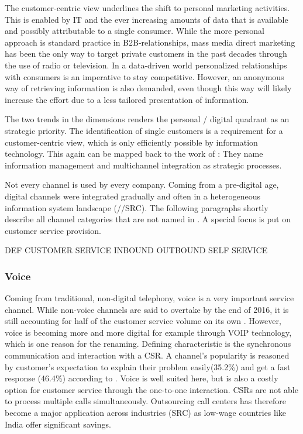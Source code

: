 		The customer-centric view underlines the shift to personal marketing activities. This is enabled by IT and the ever increasing amounts of data that is available and possibly attributable to a single consumer. While the more personal approach is standard practice in B2B-relationships, mass media direct marketing has been the only way to target private customers in the past decades through the use of radio or television. In a data-driven world personalized relationships with consumers is an imperative to stay competitive. However, an anonymous way of retrieving information is also demanded, even though this way will likely increase the effort due to a less tailored presentation of information. 
		
		The two trends in the dimensions renders the personal / digital quadrant as an strategic priority.
		The identification of single customers is a requirement for a customer-centric view, which is only efficiently possible by information technology.  
		This again can be mapped back to the work of \citeauthor{paynefrow2005}: They name information management and multichannel integration as strategic processes. 
		
		Not every channel is used by every company. Coming from a pre-digital age, digital channels were integrated gradually and often in a heterogeneous information system landscape (//SRC). The following paragraphs shortly describe all channel categories that are not named  in  \citeauthor{paynefrow2005}. A special focus is put on customer service provision. 
		
		DEF CUSTOMER SERVICE
		INBOUND
		OUTBOUND
		SELF SERVICE
		
		
		\subsubsection{Voice}
		
		Coming from traditional, non-digital telephony, voice is a very important service channel. While non-voice channels are said to overtake by the end of 2016, it is still accounting for half of the customer service volume on its own \cite{dimensiondata2016}. However, voice is becoming more and more digital for example through \acrfull{VOIP} technology, which is one reason for the renaming. Defining characteristic is the synchronous communication and interaction with a \acrfull{CSR}. A channel's popularity is reasoned by customer's expectation to explain their problem easily(35.2\%) and get a fast response (46.4\%) according to \cite{ocm2015}. Voice is well suited here, but is also a costly option for customer service through the one-to-one interaction. \acrshort{CSR}s are not able to process multiple calls simultaneously. Outsourcing call centers has therefore become a major application across industries (SRC) as low-wage countries like India offer significant savings. 
		
